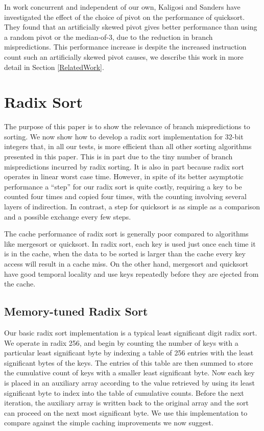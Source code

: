 \documentclass[acmtocl]{acmtrans2m}
\begin{document}
In work concurrent and independent of our own, Kaligosi and Sanders \citeyear{Kaligosi+06} 
have investigated the effect of the choice of pivot on the performance of quicksort. They found that
an artificially skewed pivot gives better performance than using a random pivot or the median-of-3,
due to the reduction in branch mispredictions. This performance increase is despite the increased instruction count
such an artificially skewed pivot causes, we describe this work in more detail in Section \ref{RelatedWork}.


\section{Radix Sort}
\label{Radixsort}

The purpose of this paper is to show the relevance of branch mispredictions to sorting. We now show how to develop a  
radix sort \cite{Friend56} implementation for 32-bit integers that, in all our tests, is more efficient than all other sorting algorithms presented in this paper. 
This is in part due to the tiny number of branch mispredictions incurred by radix sorting. It is also in part because radix sort 
operates in linear worst case time. However, in spite of its better asymptotic performance a ``step'' for our radix sort is quite costly, requiring
a key to be counted four times and copied four times, with the counting involving several layers of indirection. In contrast, a step for quicksort
is as simple as a comparison and a possible exchange every few steps. 

The cache performance of radix sort is generally poor compared
to algorithms like mergesort or quicksort. In radix sort, each key is used just once each time it is in the cache, when the data to be sorted
is larger than the cache every key access will result in a cache miss. On the other hand, mergesort and quicksort have good temporal locality and use keys 
repeatedly before they are ejected from the cache.

\subsection{Memory-tuned Radix Sort}

Our basic radix sort implementation is a typical least significant digit radix sort. We operate in radix 256, and begin by counting the number of keys
with a particular least significant byte by indexing a table of 256 entries with the least significant bytes of the keys. The entries of this table are then summed to 
store the cumulative count of keys with a smaller least significant byte. Now each key is placed in an auxiliary array according to the value retrieved by 
using its least significant byte to index into the table of cumulative counts. Before the next iteration, the auxiliary array is written back to the 
original array and the sort can proceed on the next most significant byte. We use this implementation to compare against the simple caching improvements
we now suggest.
\end{document}
